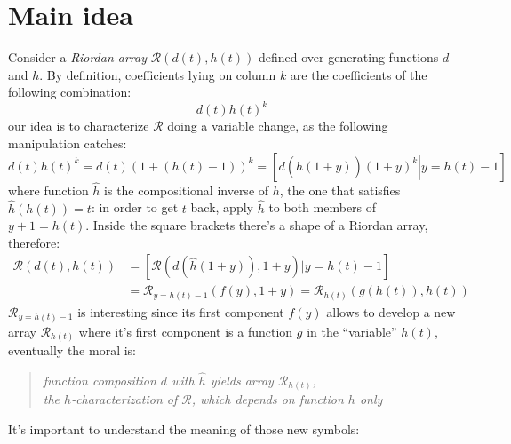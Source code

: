 
\section{Main idea}

Consider a \emph{Riordan array} $\mathcal{R}\left(d(t),h(t)\right)$ 
defined over generating functions $d$ and $h$. 
By definition, coefficients lying on 
column $k$ are the coefficients of the following combination:
\begin{displaymath}
    d(t)h(t)^k
\end{displaymath}
our idea is to characterize $\mathcal{R}$ doing a variable change, as the
following manipulation catches:
\begin{displaymath}
    d(t)h(t)^k = d(t)(1 + (h(t)-1))^k = \left[ \left. d(\hat{h}(1+y))(1+y)^k \right|y = h(t)-1  \right]
\end{displaymath}
where function $\hat{h}$ is the compositional inverse of $h$, the one that
satisfies $\hat{h}(h(t)) = t$: in order to get $t$ back, apply $\hat{h}$ to
both members of $y+1 = h(t)$.
Inside the square brackets there's a shape of a Riordan array, therefore:
\begin{displaymath}
    \begin{split}
        \mathcal{R}\left(d(t),h(t)\right) &= \left[ \mathcal{R}\left(d(\hat{h}(1+y)), 1+y\right) \left| y = h(t)-1 \right. \right]\\
        &= \mathcal{R}_{y=h(t)-1}\left( f(y), 1+y \right) =  \mathcal{R}_{h(t)}\left( g(h(t)), h(t) \right) 
    \end{split}
\end{displaymath}
$\mathcal{R}_{y=h(t)-1}$ is interesting since its first component $f(y)$ allows to 
develop a new array $\mathcal{R}_{h(t)}$ where it's first component
is a function $g$ in the ``variable'' $h(t)$, eventually the moral is:
\begin{quote}
    \emph{function composition $d$ with $\hat{h}$ yields array $\mathcal{R}_{h(t)}$,\\
        the $h$-characterization of $\mathcal{R}$, which depends on function $h$ only }
\end{quote}
It's important to understand the meaning of those new symbols:
